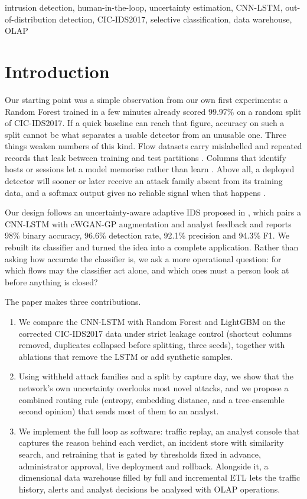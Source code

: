 \documentclass[conference]{IEEEtran}
\begin{document}
\begin{IEEEkeywords}
intrusion detection, human-in-the-loop, uncertainty estimation, CNN-LSTM, out-of-distribution detection, CIC-IDS2017, selective classification, data warehouse, OLAP
\end{IEEEkeywords}

\section{Introduction}
Our starting point was a simple observation from our own first experiments: a Random Forest
trained in a few minutes already scored 99.97\% on a random split of CIC-IDS2017. If a quick
baseline can reach that figure, accuracy on such a split cannot be what separates a usable
detector from an unusable one. Three things weaken numbers of this kind. Flow datasets carry
mislabelled and repeated records that leak between training and test partitions
\cite{engelen2021troubleshooting,liu2022error}. Columns that identify hosts or sessions let a model
memorise rather than learn \cite{arp2022dos}. Above all, a deployed detector will sooner or later
receive an attack family absent from its training data, and a softmax output gives no reliable
signal when that happens \cite{sommer2010outside,hendrycks2017baseline}.

Our design follows an uncertainty-aware adaptive IDS proposed in \cite{refpaper2025}, which pairs
a CNN-LSTM with cWGAN-GP augmentation and analyst feedback and reports 98\% binary accuracy,
96.6\% detection rate, 92.1\% precision and 94.3\% F1. We rebuilt its classifier and turned the
idea into a complete application. Rather than asking how accurate the classifier is, we ask a
more operational question: for which flows may the classifier act alone, and which ones must a
person look at before anything is closed?

The paper makes three contributions.
\begin{enumerate}
\item We compare the CNN-LSTM with Random Forest and LightGBM on the corrected CIC-IDS2017 data
under strict leakage control (shortcut columns removed, duplicates collapsed before splitting,
three seeds), together with ablations that remove the LSTM or add synthetic samples.
\item Using withheld attack families and a split by capture day, we show that the network's own
uncertainty overlooks most novel attacks, and we propose a combined routing rule (entropy,
embedding distance, and a tree-ensemble second opinion) that sends most of them to an analyst.
\item We implement the full loop as software: traffic replay, an analyst console that captures
the reason behind each verdict, an incident store with similarity search, and retraining that is
gated by thresholds fixed in advance, administrator approval, live deployment and rollback.
Alongside it, a dimensional data warehouse filled by full and incremental ETL lets the traffic
history, alerts and analyst decisions be analysed with OLAP operations.
\end{enumerate}
\end{document}
